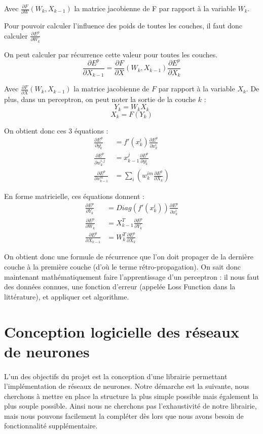 Avec $\frac{\partial F}{\partial W}(W_k, X_{k-1})$ la matrice jacobienne de F par rapport à la variable $W_k$.

Pour pouvoir calculer l'influence des poids de toutes les couches, il faut donc calculer $\frac{\partial E^p}{\partial W_k}$

On peut calculer par récurrence cette valeur pour toutes les couches.
\[
	\frac{\partial E^p}{\partial X _{k-1}} = \frac{\partial F}{\partial X}(W_k, X_{k-1})\frac{\partial E^p}{\partial X_k}
\]

Avec $\frac{\partial F}{\partial X }(W_k, X_{k-1})$ la matrice jacobienne de $F$ par rapport à la variable $X_k$. De plus, dans un perceptron, on peut noter la sortie de la couche $k$ : 
\[
Y_k = W_k X_k \]
\[
X_k = F(Y_k)
\]

On obtient donc ces 3 équations : 
\begin{align*}
\frac{\partial E^p}{\partial y_k^i} &= f'(x_k^i)\frac{\partial E^p}{\partial x_k^i} \\
\frac{\partial E^p}{\partial w_k^{i,j}}&= x^j_{k-1} \frac{\partial E^p}{\partial y_k^i}\\
\frac{\partial E^p}{\partial x_{k-1}^m} &= \sum_i(w_k^{im}\frac{\partial E^p}{\partial X_k})
\end{align*}

En forme matricielle, ces équations donnent :
\begin{align*}
\frac{\partial E^p}{\partial Y_k} &= Diag(f'(x_k^i))\frac{\partial E^p}{\partial x_k^i} \\
\frac{\partial E^p}{\partial W_k}&= X^T_{k-1} \frac{\partial E^p}{\partial Y_k}\\
\frac{\partial E^p}{\partial X_{k-1}} &= W_k^T\frac{\partial E^p}{\partial X_k}
\end{align*}

On obtient donc une formule de récurrence que l'on doit propager de la dernière couche à la première couche (d'où le terme rétro-propagation). On sait donc maintenant mathématiquement faire l'apprentissage d'un perceptron : il nous faut des données connues, une fonction d'erreur (appelée Loss Function dans la littérature), et appliquer cet algorithme.


\section{Conception logicielle des réseaux de neurones}
\paragraph*{} %
L'un des objectifs du projet est la conception d'une librairie permettant l'implémentation de réseaux de neurones. Notre démarche est la suivante, nous cherchons à mettre en place la structure la plus simple possible mais également la plus souple possible. Ainsi nous ne cherchons pas l'exhaustivité de notre librairie, mais nous pouvons facilement la compléter dès lors que nous avons besoin de fonctionnalité supplémentaire.

